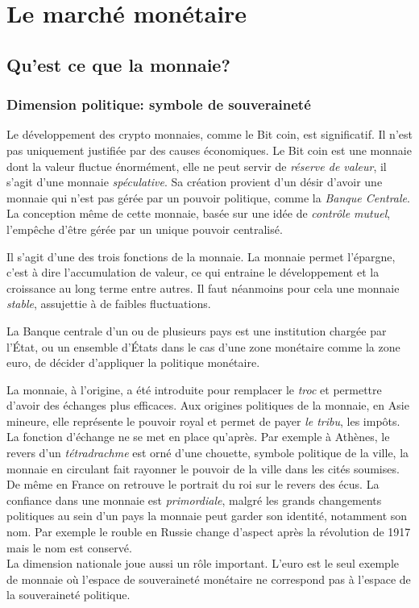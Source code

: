 \documentclass[main.tex]{subfiles}
\begin{document}
        \chapter{Le marché monétaire}
        \section{Qu'est ce que la monnaie?}
        \subsection{Dimension politique: symbole de souveraineté}
        Le développement des crypto monnaies, comme le Bit coin, est significatif. Il n'est pas uniquement justifiée par des causes économiques. Le Bit coin est une monnaie dont la valeur fluctue énormément, elle  ne peut servir de \emph{réserve de valeur}, il s'agit d'une monnaie \emph{spéculative}. Sa création provient d'un désir d'avoir une monnaie qui n'est pas gérée par un pouvoir politique, comme la \emph{Banque Centrale}. La conception même de cette monnaie, basée sur une idée de \emph{contrôle mutuel}, l'empêche d'être gérée par un unique pouvoir centralisé.

        \begin{definition}
                Il s'agit d'une des trois fonctions de la monnaie. La monnaie permet l'épargne, c'est à dire l'accumulation de valeur, ce qui entraine le développement et la croissance au long terme entre autres. Il faut néanmoins pour cela une monnaie \emph{stable}, assujettie à de faibles fluctuations.
        \end{definition}

        \begin{definition}
                La Banque centrale d'un ou de plusieurs pays est une institution chargée par l'État, ou un ensemble d'États dans le cas d’une zone monétaire comme la zone euro, de décider d'appliquer la politique monétaire.
        \end{definition}

La monnaie, à l'origine, a été introduite pour remplacer le \emph{troc} et permettre d'avoir des échanges plus efficaces. Aux origines politiques de la monnaie, en Asie mineure, elle représente le pouvoir royal et permet de payer \emph{le tribu}, les impôts. La fonction d'échange ne se met en place qu'après. Par exemple à Athènes, le revers d'un \emph{tétradrachme} est orné d'une chouette, symbole politique de la ville, la monnaie en circulant fait rayonner le pouvoir de la ville dans les cités soumises. De même en France on retrouve le portrait du roi sur le revers des écus.
        La confiance dans une monnaie est \emph{primordiale}, malgré les grands changements politiques au sein d'un pays la monnaie peut garder son identité, notamment son nom. Par exemple le rouble en Russie change d'aspect après la révolution de 1917 mais le nom est conservé. \\
        La dimension nationale joue aussi un rôle important. L'euro est le seul exemple de monnaie où l'espace de souveraineté monétaire ne correspond pas à l'espace de la souveraineté politique.
\end{document}
